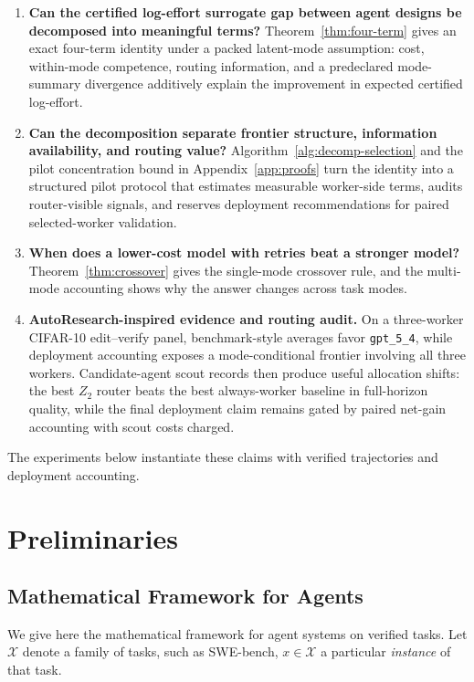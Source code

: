 \documentclass{article}
\begin{document}
\begin{enumerate}[leftmargin=1.4em,itemsep=0.15em]
  \item \textbf{Can the certified log-effort surrogate gap between agent designs be decomposed into meaningful terms?}
  Theorem~\ref{thm:four-term} gives an exact four-term identity under a packed latent-mode assumption: cost, within-mode competence, routing information, and a predeclared mode-summary divergence additively explain the improvement in expected certified log-effort.
  \item \textbf{Can the decomposition separate frontier structure, information availability, and routing value?}
  Algorithm~\ref{alg:decomp-selection} and the pilot concentration bound in Appendix~\ref{app:proofs} turn the identity into a structured pilot protocol that estimates measurable worker-side terms, audits router-visible signals, and reserves deployment recommendations for paired selected-worker validation.
  \item \textbf{When does a lower-cost model with retries beat a stronger model?}
  Theorem~\ref{thm:crossover} gives the single-mode crossover rule, and the multi-mode accounting shows why the answer changes across task modes.
  \item \textbf{AutoResearch-inspired evidence and routing audit.}
    On a three-worker CIFAR-10 edit--verify panel, benchmark-style averages favor
    \texttt{gpt\_5\_4}, while deployment accounting exposes a mode-conditional
    frontier involving all three workers.
    Candidate-agent scout records then produce useful allocation shifts: the best
    \(Z_2\) router beats the best always-worker baseline in full-horizon quality,
    while the final deployment claim remains gated by paired net-gain accounting
    with scout costs charged.
\end{enumerate}

The experiments below instantiate these claims with verified trajectories and deployment accounting.

\section{Preliminaries}
\label{sec:framework}

\subsection{Mathematical Framework for Agents}
We give here the mathematical framework for agent systems on verified tasks. Let \(\mathcal X\) denote a family of tasks, such as
SWE-bench, \(x\in\mathcal X\) a particular \textit{instance} of that task.
\end{document}
